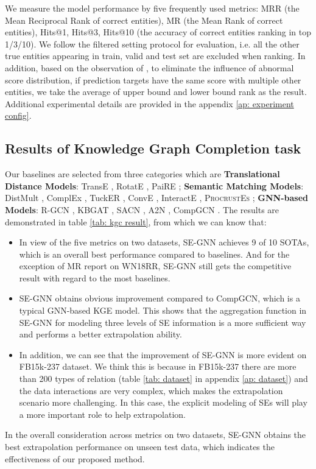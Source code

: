 \documentclass[letterpaper]{article} \usepackage{aaai22}  \usepackage{times}  \usepackage{helvet}  \usepackage{courier}  \usepackage[hyphens]{url}  \usepackage{graphicx} \urlstyle{rm} \def\UrlFont{\rm}  \usepackage{natbib}  \usepackage{caption} \DeclareCaptionStyle{ruled}{labelfont=normalfont,labelsep=colon,strut=off} \frenchspacing  \setlength{\pdfpagewidth}{8.5in}  \setlength{\pdfpageheight}{11in}  \usepackage{algorithm}
\begin{document}
We measure the model performance by five frequently used metrics: MRR (the Mean Reciprocal Rank of correct entities), MR (the Mean Rank of correct entities), Hits@1, Hits@3, Hits@10 (the accuracy of correct entities ranking in top 1/3/10). 
We follow the filtered setting protocol \cite{NeurIPS_2013_Bordes_TransE} for evaluation, i.e. all the other true entities appearing in train, valid and test set are excluded when ranking. 
In addition, based on the observation of \cite{ACL_2020_Sun_re-eval}, to eliminate the influence of abnormal score distribution, if prediction targets have the same score with multiple other entities, we take the average of upper bound and lower bound rank as the result.
Additional experimental details are provided in the appendix \ref{ap: experiment config}.

\subsection{Results of Knowledge Graph Completion task}
Our baselines are selected from three categories which are \textbf{Translational Distance Models}: TransE \cite{NeurIPS_2013_Bordes_TransE}, RotatE \cite{ICLR_2019_Sun_RotatE}, PaiRE \cite{ACL_2021_Chao_PaiRE}; \textbf{Semantic Matching Models}: DistMult \cite{ICLR_2015_Yang_DistMult}, ComplEx \cite{ICML_2016_Trouillon_ComplEx}, TuckER \cite{EMNLP_2019_Balazevic_TuckER}, ConvE \cite{AAAI_2018_Dettmers_ConvE_WN18RR}, InteractE \cite{AAAI_2020_Vashishth_InteractE}, \textsc{ProcrustEs} \cite{NAACL_2021_Peng_ProcrustEs}; \textbf{GNN-based Models}: R-GCN \cite{ESWC_2018_Schlichtkrull_R-GCN}, KBGAT \cite{ACL_2019_Nathani_KBGAT}, SACN \cite{AAAI_2019_Shang_SACN}, A2N \cite{ACL_2019_Bansal_A2N}, CompGCN \cite{ICLR_2020_Vashishth_CompGCN}. The results are demonstrated in table \ref{tab: kgc result}, from which we can know that: 
\begin{itemize}
    \item In view of the five metrics on two datasets, SE-GNN achieves 9 of 10 SOTAs, which is an
    overall best performance compared to baselines. 
    And for the exception of MR report on WN18RR, SE-GNN still gets the competitive result with regard to the most baselines. 
    \item SE-GNN obtains obvious improvement compared to CompGCN, which is a typical GNN-based KGE model. This shows that the aggregation function in SE-GNN for modeling three levels of SE information is a more sufficient way and performs a better extrapolation ability. 
    \item In addition, we can see that the improvement of SE-GNN is more evident on FB15k-237 dataset. We think this is because in FB15k-237 there are more than 200 types of relation (table \ref{tab: dataset} in appendix \ref{ap: dataset}) and the data interactions are very complex, which makes the extrapolation scenario more challenging. In this case, the explicit modeling of SEs will play a more important role to help extrapolation.
\end{itemize}
In the overall consideration across metrics on two datasets, SE-GNN obtains the best extrapolation performance on unseen test data, which indicates the effectiveness of our proposed method.
\end{document}
